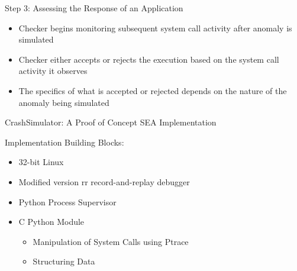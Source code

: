 \documentclass[pdf]{beamer}
\begin{document}
%
%


\begin{frame}{Step 3: Assessing the Response of an Application}
  \begin{itemize}
    \item{Checker begins monitoring subsequent system call activity
      after anomaly is simulated}
    \item{Checker either accepts or rejects the execution based on the system
      call activity it observes}
    \item{The specifics of what is accepted or rejected depends on the nature
      of the anomaly being simulated}
  \end{itemize}
\end{frame}


\begin{frame}{CrashSimulator: A Proof of Concept SEA Implementation}

  Implementation Building Blocks:

  \begin{itemize}
    \item{32-bit Linux}
    \item{Modified version rr record-and-replay debugger}
    \item{Python Process Supervisor}
    \item{C Python Module}
      \begin{itemize}
        \item{Manipulation of System Calls using Ptrace}
        \item{Structuring Data}
      \end{itemize}
  \end{itemize}
\end{frame}
\end{document}
